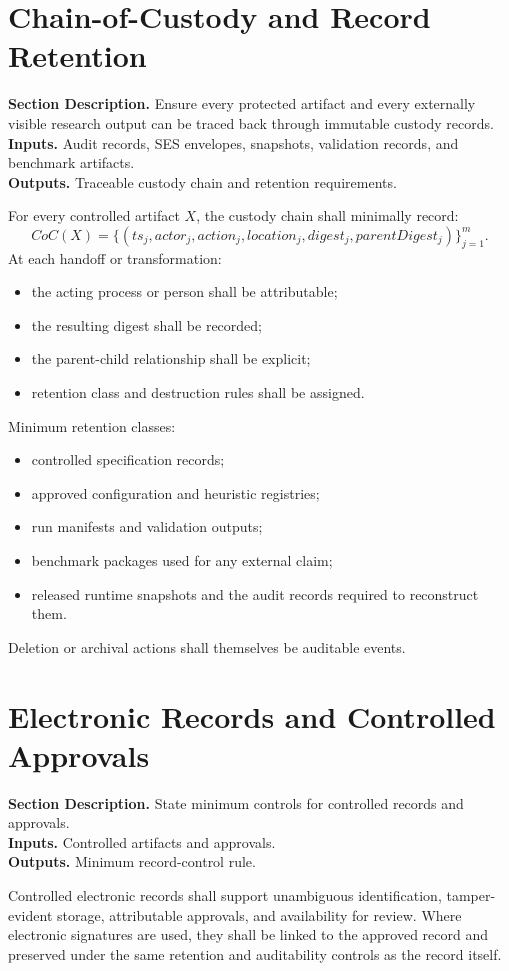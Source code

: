 \documentclass[11pt]{report}
\newcommand{\meta}[3]{\textbf{Section Description.} #1\\
\textbf{Inputs.} #2\\
\textbf{Outputs.} #3\par}
\begin{document}
\section{Chain-of-Custody and Record Retention}
\meta{Ensure every protected artifact and every externally visible research output can be traced back through immutable custody records.}{Audit records, SES envelopes, snapshots, validation records, and benchmark artifacts.}{Traceable custody chain and retention requirements.}

For every controlled artifact $X$, the custody chain shall minimally record:
\[
CoC(X)=\{(ts_j, actor_j, action_j, location_j, digest_j, parentDigest_j)\}_{j=1}^{m}.
\]
At each handoff or transformation:
\begin{itemize}
\item the acting process or person shall be attributable;
\item the resulting digest shall be recorded;
\item the parent-child relationship shall be explicit;
\item retention class and destruction rules shall be assigned.
\end{itemize}

Minimum retention classes:
\begin{itemize}
\item controlled specification records;
\item approved configuration and heuristic registries;
\item run manifests and validation outputs;
\item benchmark packages used for any external claim;
\item released runtime snapshots and the audit records required to reconstruct them.
\end{itemize}

Deletion or archival actions shall themselves be auditable events.

\section{Electronic Records and Controlled Approvals}
\meta{State minimum controls for controlled records and approvals.}{Controlled artifacts and approvals.}{Minimum record-control rule.}

Controlled electronic records shall support unambiguous identification, tamper-evident storage, attributable approvals, and availability for review. Where electronic signatures are used, they shall be linked to the approved record and preserved under the same retention and auditability controls as the record itself.
\end{document}

